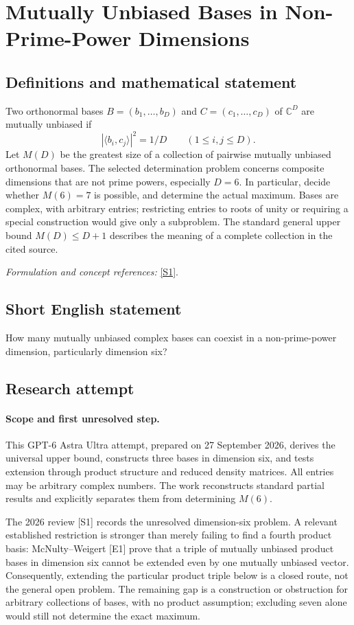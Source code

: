 \documentclass[11pt]{article}
\begin{document}
\section*{\texorpdfstring{Mutually Unbiased Bases in Non-Prime-Power Dimensions}{Mutually Unbiased Bases in Non-Prime-Power Dimensions}}\label{30004862}
\subsection{Definitions and mathematical statement}
Two orthonormal bases $B=(b_1,\ldots,b_D)$ and $C=(c_1,\ldots,c_D)$ of ${\mathbb{C}}^D$ are mutually unbiased if
\[
 |\langle b_i,c_j\rangle|^2=1/D\qquad(1\le i,j\le D).
\]
Let $M(D)$ be the greatest size of a collection of pairwise mutually unbiased orthonormal bases. The selected determination problem concerns composite dimensions that are not prime powers, especially $D=6$. In particular, decide whether $M(6)=7$ is possible, and determine the actual maximum. Bases are complex, with arbitrary entries; restricting entries to roots of unity or requiring a special construction would give only a subproblem. The standard general upper bound $M(D)\le D+1$ describes the meaning of a complete collection in the cited source.
\par\smallskip\textit{Formulation and concept references:} \href{https://quantum-journal.org/papers/q-2026-04-01-2051/}{[S1]}.

\subsection{Short English statement}
How many mutually unbiased complex bases can coexist in a non-prime-power dimension, particularly dimension six?
\subsection{Research attempt}
\paragraph{Scope and first unresolved step.}
This GPT-6 Astra Ultra attempt, prepared on 27 September 2026, derives the universal upper bound, constructs three bases in dimension six, and tests extension through product structure and reduced density matrices. All entries may be arbitrary complex numbers. The work reconstructs standard partial results and explicitly separates them from determining $M(6)$.

The 2026 review [S1] records the unresolved dimension-six problem. A relevant established restriction is stronger than merely failing to find a fourth product basis: McNulty--Weigert [E1] prove that a triple of mutually unbiased product bases in dimension six cannot be extended even by one mutually unbiased vector. Consequently, extending the particular product triple below is a closed route, not the general open problem. The remaining gap is a construction or obstruction for arbitrary collections of bases, with no product assumption; excluding seven alone would still not determine the exact maximum.
\end{document}

